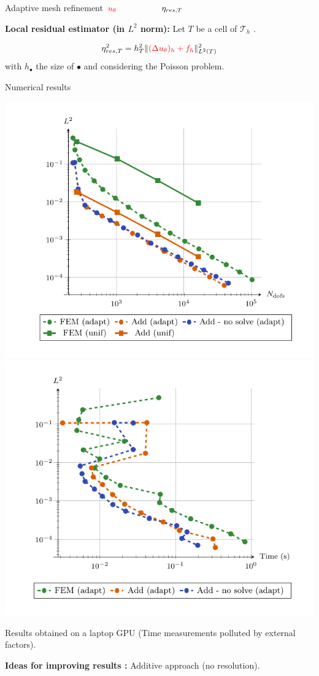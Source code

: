 \begin{frame}[noframenumbering]{Adaptive mesh refinement}
    \hspace{55pt}$\textcolor{red}{u_\theta}\hspace{55pt}\eta_{res,T}$

    \vspace{8pt}
    \textbf{Local residual estimator (in $L^2$ norm):} Let $T$ be a cell of $\mathcal{T}_h$ .

    \vspace{-8pt}
    $$\eta_{res,T}^2 = h_T^2 \|\textcolor{red}{(\Delta u_\theta)_h + f_h}\|_{L^2(T)}^2$$
    with $h_\bullet$ the size of $\bullet$ and considering the Poisson problem.
\end{frame}

\begin{frame}{Numerical results}
    \vspace{-10pt}
    \begin{center}
        \includegraphics[width=0.4\linewidth]{images/newlines/mesh/results/cvg.pdf}
        \includegraphics[width=0.4\linewidth]{images/newlines/mesh/results/times.pdf}
    \end{center}
    
    \vspace{-10pt}
    \footnotesize
    \warning \quad Results obtained on a laptop GPU (Time measurements polluted by external factors).
    
    \normalsize
    \vspace{5pt}
    \textbf{Ideas for improving results :} Additive approach (no resolution).

    \vspace{3pt}
    \begin{minipage}{0.1\linewidth}
\end{minipage}
\end{frame}
